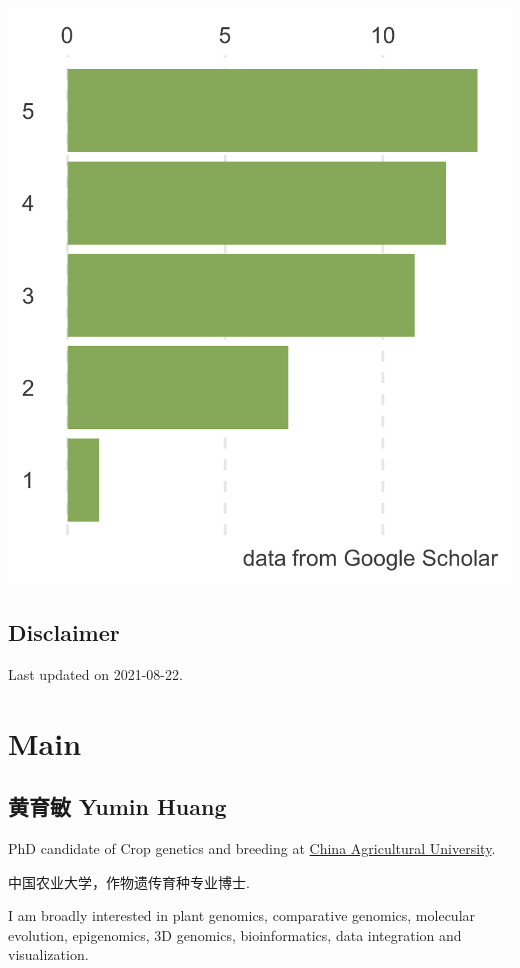 \documentclass[]{article}
\begin{document}
\includegraphics{citation.png}

\hypertarget{disclaimer}{%
\subsection{Disclaimer}\label{disclaimer}}

Last updated on 2021-08-22.

\hypertarget{main}{%
\section{Main}\label{main}}

\hypertarget{title}{%
\subsection{黄育敏 Yumin Huang}\label{title}}

PhD candidate of Crop genetics and breeding at
\href{http://www.cau.edu.cn/}{China Agricultural University}.

中国农业大学，作物遗传育种专业博士.

I am broadly interested in plant genomics, comparative genomics,
molecular evolution, epigenomics, 3D genomics, bioinformatics, data
integration and visualization.
\end{document}
